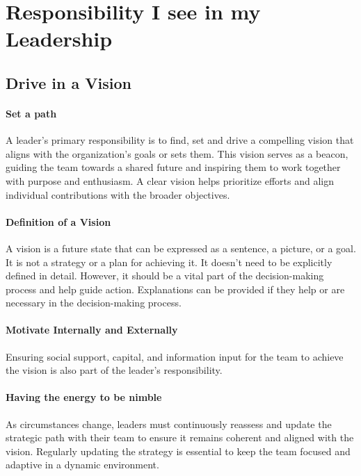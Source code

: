 \section{Responsibility I see in my Leadership}

\subsection{Drive in a Vision}
\paragraph{Set a path}
A leader's primary responsibility is to find, set and drive a compelling vision that aligns with the organization's goals or sets them. This vision serves as a beacon, guiding the team towards a shared future and inspiring them to work together with purpose and enthusiasm. A clear vision helps prioritize efforts and align individual contributions with the broader objectives.

\paragraph{Definition of a Vision}
A vision is a future state that can be expressed as a sentence, a picture, or a goal. It is not a strategy or a plan for achieving it. It doesn't need to be explicitly defined in detail. However, it should be a vital part of the decision-making process and help guide action. Explanations can be provided if they help or are necessary in the decision-making process.

\paragraph{Motivate Internally and Externally}
Ensuring social support, capital, and information input for the team to achieve the vision is also part of the leader's responsibility.

\paragraph{Having the energy to be nimble}
As circumstances change, leaders must continuously reassess and update the strategic path with their team to ensure it remains coherent and aligned with the vision. Regularly updating the strategy is essential to keep the team focused and adaptive in a dynamic environment.

